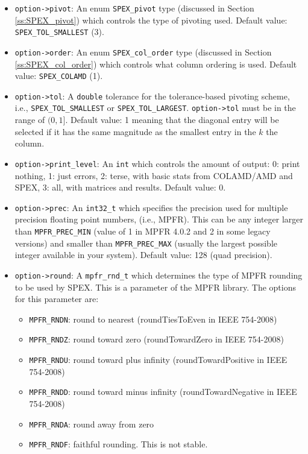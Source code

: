 \documentclass[12pt]{report}
\theoremstyle{definition}
\begin{document}
\begin{itemize}
\item
\verb|option->pivot|: An enum \verb|SPEX_pivot| type (discussed in Section
\ref{ss:SPEX_pivot}) which controls the type of pivoting used. Default value:
\verb|SPEX_TOL_SMALLEST| (3).

\item
\verb|option->order|: An enum \verb|SPEX_col_order| type (discussed in Section
\ref{ss:SPEX_col_order}) which controls what column ordering is used. Default
value: \verb|SPEX_COLAMD| (1).

\item
\verb|option->tol|: A \verb|double| tolerance for
the tolerance-based pivoting scheme, i.e., \verb|SPEX_TOL_SMALLEST| or
\verb|SPEX_TOL_LARGEST|. \verb|option->tol| must be in the range of $(0,1]$.
Default value: 1 meaning that the diagonal entry will be selected if it has the
same magnitude as the smallest entry in the $k$ the column.

\item
\verb|option->print_level|: An \verb|int| which controls the amount of
output:
0: print nothing, 1: just errors, 2: terse, with basic stats from
COLAMD/AMD and SPEX, 3: all, with matrices and results. Default value: 0.

\item
\verb|option->prec|: An \verb|int32_t| which specifies the precision used
for multiple precision floating point numbers, (i.e., MPFR). This
can be any integer larger than \verb|MPFR_PREC_MIN| (value of 1 in MPFR 4.0.2
and 2 in some legacy versions) and smaller than \verb|MPFR_PREC_MAX| (usually
the largest possible integer available in your system). Default value: 128
(quad precision).

\item
\verb|option->round|: A \verb|mpfr_rnd_t| which determines the type
of MPFR rounding to be used by SPEX. This is a parameter of the MPFR
library. The options for this parameter are:

    \begin{itemize}
        \item \verb|MPFR_RNDN|: round to nearest
            (roundTiesToEven in IEEE 754-2008)
        \item \verb|MPFR_RNDZ|: round toward zero
            (roundTowardZero in IEEE 754-2008)
        \item \verb|MPFR_RNDU|: round toward plus infinity
            (roundTowardPositive in IEEE 754-2008)
        \item \verb|MPFR_RNDD|: round toward minus infinity
            (roundTowardNegative in IEEE 754-2008)
        \item \verb|MPFR_RNDA|: round away from zero
        \item \verb|MPFR_RNDF|: faithful rounding. This is not stable.
    \end{itemize}


\end{itemize}
\end{document}
